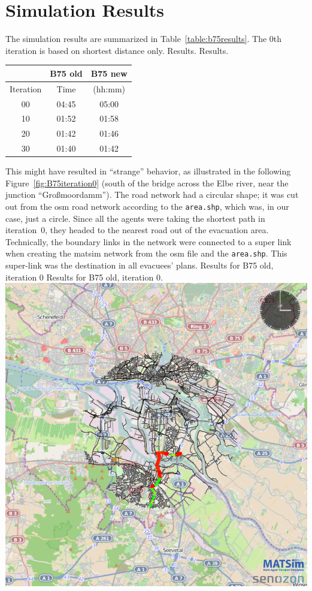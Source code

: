 \section{Simulation Results}
The simulation results are summarized in Table~\ref{table:b75results}. The 0th iteration is based on shortest distance only. 
%
\createtable%
{Results.}%
{Results.}%
{\label{table:b75results}}%
{%
\begin{tabular}{|c|c|c|}
	\hline \rule[-2ex]{0pt}{5.5ex}  & B75 old & B75 new \\ 
	\hline \rule[-2ex]{0pt}{5.5ex}  Iteration & Time &  (hh:mm) \\ 
	\hline \rule[-2ex]{0pt}{5.5ex}  00 & 04:45 &  05:00\\ 
	\hline \rule[-2ex]{0pt}{5.5ex}  10 & 01:52 &  01:58\\ 
	\hline \rule[-2ex]{0pt}{5.5ex}  20 & 01:42 &  01:46\\ 
	\hline \rule[-2ex]{0pt}{5.5ex}  30 & 01:40 &  01:42\\ 
	\hline 
\end{tabular}
}%
{}%
%
This might have resulted in ``strange'' behavior, as illustrated in the following Figure~\ref{fig:B75iteration0} (south of the bridge across the Elbe river, near the junction ``Gro{\ss}moordamm''). The road network had a circular shape; it was cut out from the osm road network according to the \lstinline|area.shp|, which was, in our case, just a circle. Since all the agents were taking the shortest path in iteration~0, they headed to the nearest road out of the evacuation area. Technically, the boundary links in the network were connected to a super link when creating the \gls{matsim} network from the \gls{osm} file and the \lstinline|area.shp|. This super-link was the destination in all evacuees' plans. 
%
\createfigure%
{Results for B75 old, iteration 0}%
{Results for B75 old, iteration 0.}%
{\label{fig:B75iteration0}}%
{\includegraphics[width=0.7\linewidth]{scenarios/figures/B75iteration0}}%
